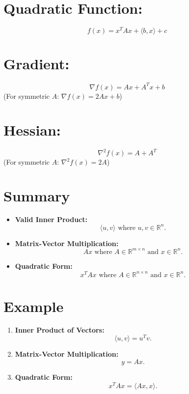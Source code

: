 \documentclass{article}
\begin{document}
\section*{Quadratic Function:}
\[
f(x) = x^T A x + \langle b, x \rangle + c
\]

\section*{Gradient:}
\[
\nabla f(x) = Ax + A^T x + b
\]
(For symmetric \(A\): \(\nabla f(x) = 2Ax + b\))

\section*{Hessian:}
\[
\nabla^2 f(x) = A + A^T
\]
(For symmetric \(A\): \(\nabla^2 f(x) = 2A\))










\section*{Summary}
\begin{itemize}
    \item \textbf{Valid Inner Product:} 
    \[
    \langle u, v \rangle \text{ where } u, v \in \mathbb{R}^n.
    \]
    
    \item \textbf{Matrix-Vector Multiplication:} 
    \[
    Ax \text{ where } A \in \mathbb{R}^{m \times n} \text{ and } x \in \mathbb{R}^n.
    \]
    
    \item \textbf{Quadratic Form:} 
    \[
    x^T A x \text{ where } A \in \mathbb{R}^{n \times n} \text{ and } x \in \mathbb{R}^n.
    \]
\end{itemize}

\section*{Example}
\begin{enumerate}[label=\arabic*.]
    \item \textbf{Inner Product of Vectors:} 
    \[
    \langle u, v \rangle = u^T v.
    \]
    
    \item \textbf{Matrix-Vector Multiplication:} 
    \[
    y = Ax.
    \]
    
    \item \textbf{Quadratic Form:} 
    \[
    x^T A x = \langle Ax, x \rangle.
    \]
\end{enumerate}
\end{document}
